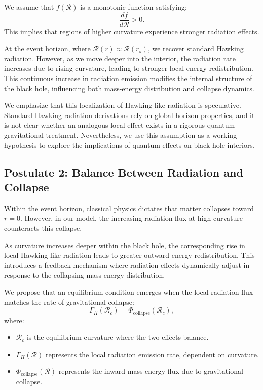 We assume that \( f(\mathcal{R}) \) is a monotonic function satisfying:
\begin{equation}
    \frac{df}{d\mathcal{R}} > 0.
\end{equation}
This implies that regions of higher curvature experience stronger radiation effects.

At the event horizon, where \( \mathcal{R}(r) \approx \mathcal{R}(r_s) \), we recover standard Hawking radiation. However, as we move deeper into the interior, the radiation rate increases due to rising curvature, leading to stronger local energy redistribution. This continuous increase in radiation emission modifies the internal structure of the black hole, influencing both mass-energy distribution and collapse dynamics.

We emphasize that this localization of Hawking-like radiation is speculative. Standard Hawking radiation derivations rely on global horizon properties, and it is not clear whether an analogous local effect exists in a rigorous quantum gravitational treatment. Nevertheless, we use this assumption as a working hypothesis to explore the implications of quantum effects on black hole interiors.
\subsection{Postulate 2: Balance Between Radiation and Collapse}
Within the event horizon, classical physics dictates that matter collapses toward \( r=0 \). However, in our model, the increasing radiation flux at high curvature counteracts this collapse.

As curvature increases deeper within the black hole, the corresponding rise in local Hawking-like radiation leads to greater outward energy redistribution. This introduces a feedback mechanism where radiation effects dynamically adjust in response to the collapsing mass-energy distribution.

We propose that an equilibrium condition emerges when the local radiation flux matches the rate of gravitational collapse:
\begin{equation}
    \Gamma_H(\mathcal{R}_c) = \Phi_{\text{collapse}}(\mathcal{R}_c),
\end{equation}
where:
\begin{itemize}
    \item \( \mathcal{R}_c \) is the equilibrium curvature where the two effects balance.
    \item \( \Gamma_H(\mathcal{R}) \) represents the local radiation emission rate, dependent on curvature.
    \item \( \Phi_{\text{collapse}}(\mathcal{R}) \) represents the inward mass-energy flux due to gravitational collapse.
\end{itemize}

